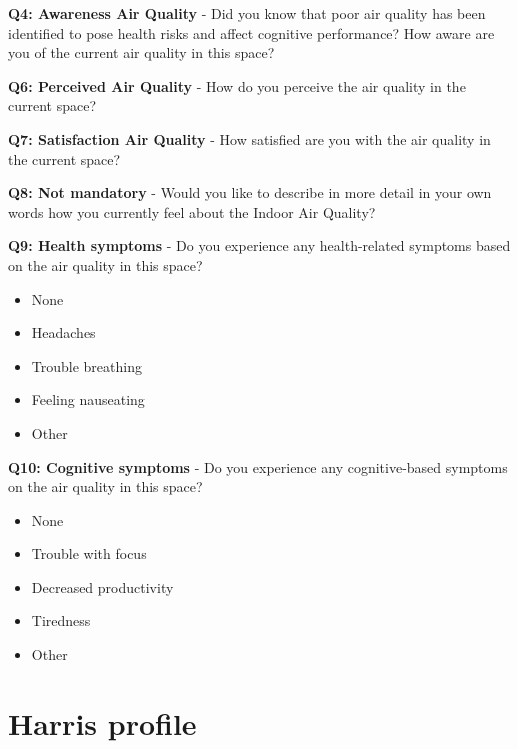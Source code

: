 \begin{appendices}
\textbf{Q4: Awareness Air Quality} - Did you know that poor air quality has been identified to pose health risks and affect cognitive performance? How aware are you of the current air quality in this space?

\textbf{Q6: Perceived Air Quality} - How do you perceive the air quality in the current space?

\textbf{Q7: Satisfaction Air Quality} - How satisfied are you with the air quality in the current space?

\textbf{Q8: Not mandatory} - Would you like to describe in more detail in your own words how you currently feel about the Indoor Air Quality?

\textbf{Q9: Health symptoms} - Do you experience any health-related symptoms based on the air quality in this space?

\begin{itemize}
    \item None
    \item Headaches
    \item Trouble breathing
    \item Feeling nauseating
    \item Other
\end{itemize}

\textbf{Q10: Cognitive symptoms} - Do you experience any cognitive-based symptoms on the air quality in this space?

\begin{itemize}
    \item None
    \item Trouble with focus
    \item Decreased productivity
    \item Tiredness
    \item Other
\end{itemize}


\section{Harris profile}
\label{appendix:profile}



\end{appendices}
